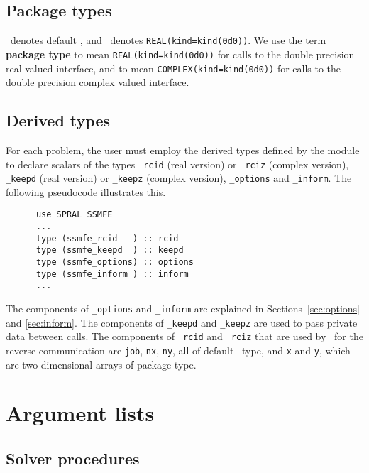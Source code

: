 \subsection{Package types} 

\Integer\ denotes default \Integer, and \REALDP\ denotes
\texttt{REAL(kind=kind(0d0))}. We use the term {\bf package type} to mean
\texttt{REAL(kind=kind(0d0))} for calls to the double precision real valued
interface, and to mean \texttt{COMPLEX(kind=kind(0d0))} for calls to the double
precision complex valued interface.

\subsection{Derived types}
\label{derived types}
For each problem, the user must employ the derived types defined by the
module to declare scalars of the types 
{\tt \solver\_rcid} (real version) or 
{\tt \solver\_rciz} (complex version), 
{\tt \solver\_keepd} (real version) or
{\tt \solver\_keepz} (complex version),
{\tt \solver\_options} and 
{\tt \solver\_inform}.
The following pseudocode illustrates this.
\begin{verbatim}
      use SPRAL_SSMFE    
      ...
      type (ssmfe_rcid   ) :: rcid
      type (ssmfe_keepd  ) :: keepd
      type (ssmfe_options) :: options
      type (ssmfe_inform ) :: inform
      ...
\end{verbatim}

The components of 
{\tt \solver\_options} and 
{\tt \solver\_inform} are explained
in Sections~\ref{sec:options} and \ref{sec:inform}. 
The components of {\tt \solver\_keepd} and {\tt \solver\_keepz} 
are used to pass 
private data between calls. 
The components of
{\tt \solver\_rcid} and 
{\tt \solver\_rciz} 
that are used by \fullpackagename\ 
for the reverse communication are
{\tt job},
{\tt nx},
{\tt ny}, all of default \Integer\ type,
and
{\tt x} and {\tt y},
which are 
two-dimensional arrays
of package type.


\section{Argument lists}

\subsection{Solver procedures}

